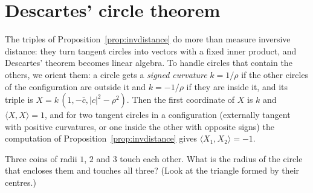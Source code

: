 \section{Descartes' circle theorem}

The triples of Proposition~\ref{prop:invdistance} do more than measure inversive distance: they turn tangent circles into vectors with a
fixed inner product, and Descartes' theorem becomes linear algebra. To handle circles that contain the others, we orient them: a circle
gets a \emph{signed curvature} $k=1/\rho$ if the other circles of the configuration are outside it and $k=-1/\rho$ if they are inside it, and
its triple is $X=k\,(1,-\bar c,|c|^2-\rho^2)$. Then the first coordinate of $X$ is $k$ and $\langle X,X\rangle=1$, and for two tangent circles
in a configuration (externally tangent with positive curvatures, or one inside the other with opposite signs) the computation of
Proposition~\ref{prop:invdistance} gives $\langle X_1,X_2\rangle=-1$.

\begin{think}
Three coins of radii $1$, $2$ and $3$ touch each other. What is the radius of the circle that encloses them and touches all three? (Look at the
triangle formed by their centres.)
\end{think}

